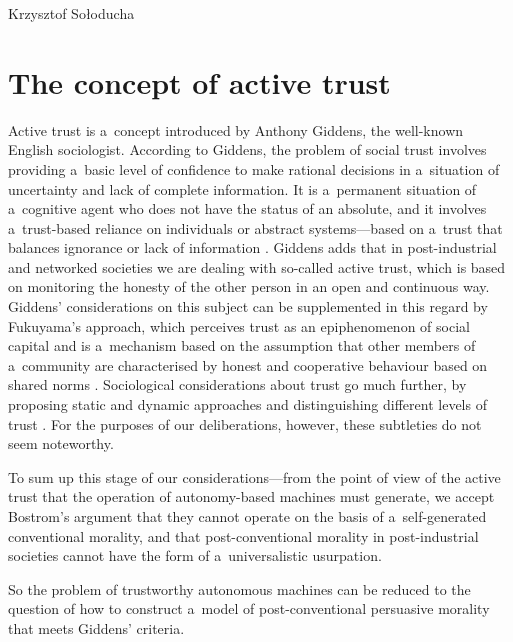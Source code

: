 \begin{artengenv}{Krzysztof Sołoducha}
\section*{The concept of active trust}
Active trust is a~concept introduced by Anthony Giddens, the well-known English sociologist. According to Giddens, the problem of social trust involves providing a~basic level of confidence to make rational decisions in a~situation of uncertainty and lack of complete information. It is a~permanent situation of a~cognitive agent who does not have the status of an absolute, and it involves a~trust-based reliance on individuals or abstract systems—based on a~trust that balances ignorance or lack of information
\parencite[][p.318]{giddens_modernity_1991}. %
 Giddens adds that in post-industrial and networked societies we are dealing with so-called active trust, which is based on monitoring the honesty of the other person in an open and continuous way. Giddens' considerations on this subject can be supplemented in this regard by Fukuyama's approach, which perceives trust as an epiphenomenon of social capital and is a~mechanism based on the assumption that other members of a~community are characterised by honest and cooperative behaviour based on shared norms 
\parencite[][p.38]{fukuyama_trust_1995}. %
 Sociological considerations about trust go much further, by proposing static and dynamic approaches and distinguishing different levels of trust 
\parencite[][pp.85–86]{milaszewicz_zaufanie_2016}. %
 For the purposes of our deliberations, however, these subtleties do not seem noteworthy.

To sum up this stage of our considerations—from the point of view of the active trust that the operation of autonomy-based machines must generate, we accept Bostrom's argument that they cannot operate on the basis of a~self-generated conventional morality, and that post-conventional morality in post-industrial societies cannot have the form of a~universalistic usurpation.

So the problem of trustworthy autonomous machines can be reduced to the question of how to construct a~model of post-conventional persuasive morality that meets Giddens' criteria.


\end{artengenv}
